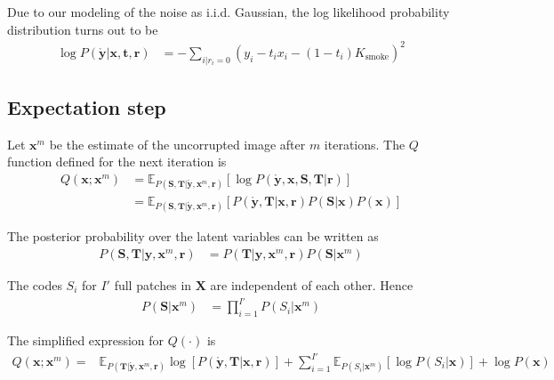 Due to our modeling of the noise as i.i.d. Gaussian, the log likelihood probability distribution turns out to be
\begin{align}
\log P \left( \mathbf{\mathring y}| \mathbf{x}, \mathbf{t}, \mathbf{r} \right) &= - \sum_{i | r_i = 0} \left( y_i - t_i x_i - (1-t_i) K_\text{smoke} \right)^2
\end{align}


\subsection{Expectation step}
Let $\mathbf{x}^m$ be the estimate of the uncorrupted image after $m$ iterations. The $Q$ function defined for the next iteration is
\begin{align}
Q(\mathbf{x}; \mathbf{x}^m) &= \mathbb{E}_{ P \left( \mathbf{S}, \mathbf{T} | \mathbf{\mathring y}, \mathbf{x}^m, \mathbf{r} \right)} \left[ \log P \left( \mathbf{\mathring y}, \mathbf{x}, \mathbf{S}, \mathbf{T} | \mathbf{r} \right)\right] \nonumber \\
&= \mathbb{E}_{ P \left( \mathbf{S}, \mathbf{T} | \mathbf{\mathring y}, \mathbf{x}^m, \mathbf{r} \right)} \left[ P \left( \mathbf{\mathring y}, \mathbf{T}| \mathbf{x}, \mathbf{r} \right) P \left( \mathbf{S} | \mathbf{x} \right) P \left( \mathbf{x} \right) \right] \label{eqn:Qvbem2}
\end{align}

The posterior probability over the latent variables can be written as
\begin{align}
P \left( \mathbf{S}, \mathbf{T} | \mathbf{y}, \mathbf{x}^m, \mathbf{r} \right) &= P \left( \mathbf{T} | \mathbf{y}, \mathbf{x}^m, \mathbf{r} \right) P \left( \mathbf{S} | \mathbf{x}^m \right) \label{eqn:latentPosterior}
\end{align}

The codes $S_i$ for $I'$ full patches in $\mathbf{X}$ are independent of each other. Hence
\begin{align}
P \left( \mathbf{S} | \mathbf{x}^m\right) &= \prod_{i=1}^{I'} P \left( S_i | \mathbf{x}^m \right) \label{eqn:obCodeFact} 
\end{align}

The simplified expression for $Q\left( \cdot \right)$ is
\begin{align}
Q(\mathbf{x}; \mathbf{x}^m) = &\mathbb{E}_{ P \left( \mathbf{T} | \mathbf{\mathring y}, \mathbf{x}^m, \mathbf{r} \right)} \log \left[ P \left( \mathbf{\mathring y}, \mathbf{T} | \mathbf{x}, \mathbf{r} \right) \right] 
+ \sum_{i=1}^{I'} \mathbb{E}_{ P \left( S_i | \mathbf{x}^m \right)} \left[ \log P \left( S_i | \mathbf{x} \right) \right]
+ \log P \left( \mathbf{x} \right) \label{eqn:QSimplified} 
\end{align}

